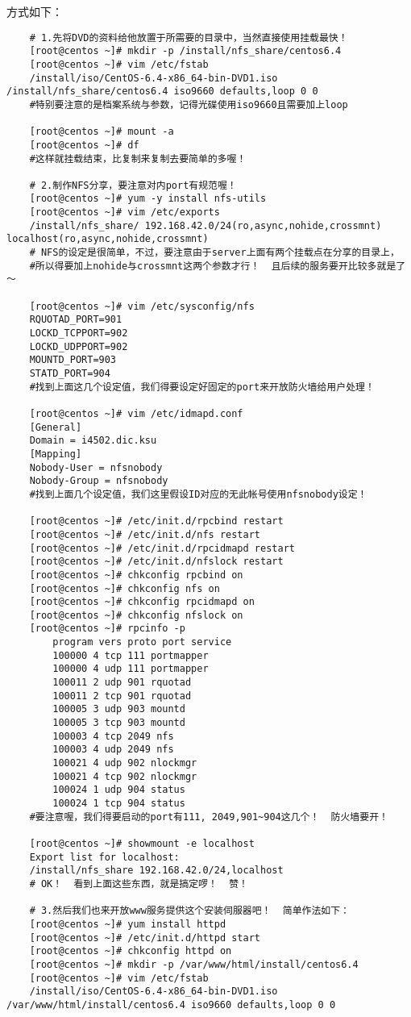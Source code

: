 \documentclass[a4paper,left=1.5cm,right=1.5cm,11pt]{article}
\begin{document}
	方式如下：
	\begin{lstlisting}
	# 1.先将DVD的资料给他放置于所需要的目录中，当然直接使用挂载最快！
	[root@centos ~]# mkdir -p /install/nfs_share/centos6.4
	[root@centos ~]# vim /etc/fstab
	/install/iso/CentOS-6.4-x86_64-bin-DVD1.iso /install/nfs_share/centos6.4 iso9660 defaults,loop 0 0
	#特别要注意的是档案系统与参数，记得光碟使用iso9660且需要加上loop

	[root@centos ~]# mount -a
	[root@centos ~]# df
	#这样就挂载结束，比复制来复制去要简单的多喔！

	# 2.制作NFS分享，要注意对内port有规范喔！
	[root@centos ~]# yum -y install nfs-utils
	[root@centos ~]# vim /etc/exports
	/install/nfs_share/ 192.168.42.0/24(ro,async,nohide,crossmnt) localhost(ro,async,nohide,crossmnt)
	# NFS的设定是很简单，不过，要注意由于server上面有两个挂载点在分享的目录上， 
	#所以得要加上nohide与crossmnt这两个参数才行！  且后续的服务要开比较多就是了～

	[root@centos ~]# vim /etc/sysconfig/nfs
	RQUOTAD_PORT=901 
	LOCKD_TCPPORT=902 
	LOCKD_UDPPORT=902 
	MOUNTD_PORT=903 
	STATD_PORT=904
	#找到上面这几个设定值，我们得要设定好固定的port来开放防火墙给用户处理！

	[root@centos ~]# vim /etc/idmapd.conf
	[General]
	Domain = i4502.dic.ksu
	[Mapping]
	Nobody-User = nfsnobody
	Nobody-Group = nfsnobody
	#找到上面几个设定值，我们这里假设ID对应的无此帐号使用nfsnobody设定！

	[root@centos ~]# /etc/init.d/rpcbind restart
	[root@centos ~]# /etc/init.d/nfs restart
	[root@centos ~]# /etc/init.d/rpcidmapd restart
	[root@centos ~]# /etc/init.d/nfslock restart
	[root@centos ~]# chkconfig rpcbind on
	[root@centos ~]# chkconfig nfs on
	[root@centos ~]# chkconfig rpcidmapd on
	[root@centos ~]# chkconfig nfslock on
	[root@centos ~]# rpcinfo -p
		program vers proto port service
		100000 4 tcp 111 portmapper
		100000 4 udp 111 portmapper
		100011 2 udp 901 rquotad
		100011 2 tcp 901 rquotad
		100005 3 udp 903 mountd
		100005 3 tcp 903 mountd
		100003 4 tcp 2049 nfs
		100003 4 udp 2049 nfs
		100021 4 udp 902 nlockmgr
		100021 4 tcp 902 nlockmgr
		100024 1 udp 904 status
		100024 1 tcp 904 status
	#要注意喔，我们得要启动的port有111, 2049,901~904这几个！  防火墙要开！

	[root@centos ~]# showmount -e localhost
	Export list for localhost:
	/install/nfs_share 192.168.42.0/24,localhost
	# OK！  看到上面这些东西，就是搞定啰！  赞！

	# 3.然后我们也来开放www服务提供这个安装伺服器吧！  简单作法如下：
	[root@centos ~]# yum install httpd
	[root@centos ~]# /etc/init.d/httpd start
	[root@centos ~]# chkconfig httpd on
	[root@centos ~]# mkdir -p /var/www/html/install/centos6.4
	[root@centos ~]# vim /etc/fstab
	/install/iso/CentOS-6.4-x86_64-bin-DVD1.iso /var/www/html/install/centos6.4 iso9660 defaults,loop 0 0


\end{lstlisting}
\end{document}
